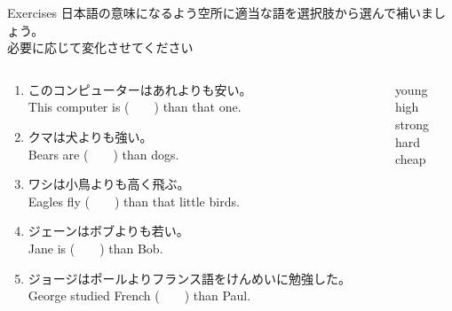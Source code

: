 \documentclass[aspectratio=169,xcolor={dvipsnames,table}]{beamer}
\begin{document}
\begin{frame}[plain]{Exercises}
日本語の意味になるよう空所に適当な語を選択肢から選んで補いましょう。\\必要に応じて変化させてください%
\hfill{\scriptsize {}}

\begin{columns}[t]
 \begin{column}{.78\textwidth}
   \begin{enumerate}
  \item このコンピューターはあれよりも安い。\\
	This computer is (~~~~) than that one. 
    \item クマは犬よりも強い。\\
	Bears are (~~~~) than dogs. 
    \item ワシは小鳥よりも高く飛ぶ。\\
	Eagles fly (~~~~) than that little birds. 
    \item ジェーンはボブよりも若い。\\
	Jane is (~~~~) than Bob. 
    \item ジョージはポールよりフランス語をけんめいに勉強した。\\
	George studied French (~~~~) than Paul. 
 \end{enumerate}
 \end{column}
\begin{column}{.2\textwidth}
 \begin{tcolorbox}
  young\\
  high\\
  strong\\
  hard\\
  cheap
 \end{tcolorbox}
\end{column}
\end{columns}
\end{frame}
\end{document}
